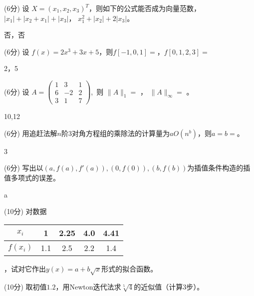 \documentclass[12pt,letter]{ustcexam}
\def\ds{\displaystyle}
\begin{document}
\begin{problems}
\qu (6分) 设 $X=(x_1,x_2,x_3)^T$，则如下的公式能否成为向量范数， \\
$|x_1|+|x_2+x_1|+|x_3|$\twob\oneb ，
$x_1^2+|x_2|+2|x_3|$\twob\oneb 。
\begin{sol}
 否，否
\end{sol}

\qu (6分) 设 $ f(x)=2x^3+3x+5 $，则$f[-1,0,1]=$\twob\twob ，$ f[0,1,2,3]=$ \twob\twob
\begin{sol}
 2，5
\end{sol}

\question (6分) 设 $ \ds{A=\begin {pmatrix} 1 & 3 & 1 \\
6 & -2 & 2 \\ 3 & 1 & 7 \end {pmatrix}}$,\  则 $ \|A\|_1=$ \sixb ，
$ \|A\|_\infty =$ \sixb 。
\begin{sol}
10,12
\end{sol}

\qu (6分) 用追赶法解$n$阶3对角方程组的乘除法的计算量为$a O(n^b)$，则$a=$\fourb $b=$\fourb。
\begin{sol}
3  
\end{sol}

\qu (6分) 写出以$(a,f(a),f'(a)),(0,f(0)),(b,f(b))$为插值条件构造的插值多项式的误差\sixb\sixb\tenb 。
\begin{sol}
a
\end{sol}

\newpage
{}
\qu (10分) 对数据 
\begin{tabular}{c|cccc} $x_i$  & 1 & 2.25 & 4.0 & 4.41
\\\hline $f(x_i)$ & 1.1 & 2.5 & 2.2 & 1.4
\end{tabular} ，试对它作出$y(x)=a+b \sqrt{x}$形式的拟合函数。

\vspace*{0.4\textheight}

\qu (10分) 取初值$1.2$，用Newton迭代法求$\sqrt[5]{4}$的近似值（计算3步）。


\newpage


\end{problems}
\end{document}
